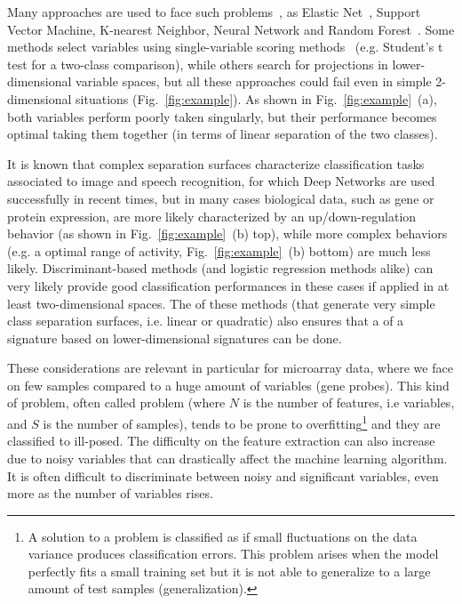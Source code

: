 \documentclass{standalone}
\begin{document}
Many approaches are used to face such problems~\cite{Guyon2002}, as Elastic Net~\cite{Hughey2015}, Support Vector Machine, K-nearest Neighbor, Neural Network and Random Forest~\cite{Pang2012}.
Some methods select variables using single-variable scoring methods~\cite{Eckhard2012, Hocking1976} (e.g. Student's t test for a two-class comparison), while others search for projections in lower-dimensional variable spaces, but all these approaches could fail even in simple 2-dimensional situations (Fig.~\ref{fig:example}).
As shown in Fig.~\ref{fig:example}~(a), both variables perform poorly taken singularly, but their performance becomes optimal taking them together (in terms of linear separation of the two classes).

It is known that complex separation surfaces characterize classification tasks associated to image and speech recognition, for which Deep Networks are used successfully in recent times, but in many cases biological data, such as gene or protein expression, are more likely characterized by an up/down-regulation behavior (as shown in Fig.~\ref{fig:example}~(b) top), while more complex behaviors (e.g. a  optimal range of activity, Fig.~\ref{fig:example}~(b) bottom) are much less likely.
Discriminant-based methods (and logistic regression methods alike) can very likely provide good classification performances in these cases if applied in at least two-dimensional spaces.
The  of these methods (that generate very simple class separation surfaces, i.e. linear or quadratic) also ensures that a  of a signature based on lower-dimensional signatures can be done.

These considerations are relevant in particular for microarray data, where we face on few samples compared to a huge amount of variables (gene probes).
This kind of problem, often called  problem (where $N$ is the number of features, i.e variables, and $S$ is the number of samples), tends to be prone to overfitting\footnote{
  A solution to a problem is classified as  if small fluctuations on the data variance produces classification errors.
  This problem arises when the model perfectly fits a small training set but it is not able to generalize to a large amount of test samples (generalization).
} and they are classified to ill-posed.
The difficulty on the feature extraction can also increase due to noisy variables that can drastically affect the machine learning algorithm.
It is often difficult to discriminate between noisy and significant variables, even more as the number of variables rises.
\end{document}

